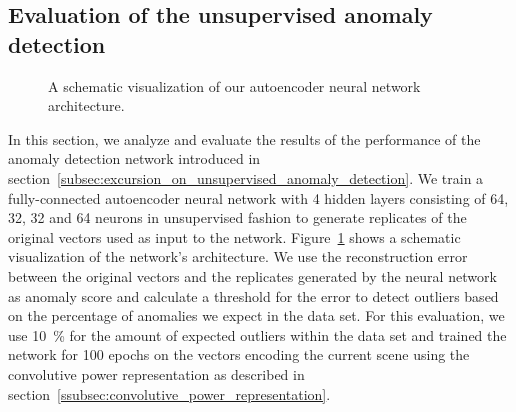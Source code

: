 \subsection{Evaluation of the unsupervised anomaly detection}%
\label{subsec:evaluation_of_the_unsupervised_anomaly_detection}

\begin{figure}[t]
	\centering
    \caption{A schematic visualization of our autoencoder neural network architecture.} 
    \label{fig:autoenc_arch}
\end{figure}

In this section, we analyze and evaluate the results of the performance of the anomaly detection network introduced in section~\ref{subsec:excursion_on_unsupervised_anomaly_detection}.
We train a fully-connected autoencoder neural network with \num{4} hidden layers consisting of \num{64}, \num{32}, \num{32} and \num{64} neurons in unsupervised fashion to generate replicates of the original vectors used as input to the network.
Figure~\ref{fig:autoenc_arch} shows a schematic visualization of the network's architecture.
We use the reconstruction error between the original vectors and the replicates generated by the neural network as anomaly score and calculate a threshold for the error to detect outliers based on the percentage of anomalies we expect in the data set.
For this evaluation, we use \SI{10}{\percent} for the amount of expected outliers within the data set and trained the network for \num{100} epochs on the vectors encoding the current scene using the convolutive power representation as described in section~\ref{ssubsec:convolutive_power_representation}.


